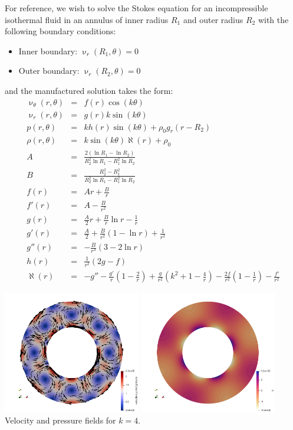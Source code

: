 For reference, we wish to solve the Stokes equation for an incompressible
isothermal fluid in an annulus of inner radius $R_1$
and outer radius $R_2$ with the following boundary conditions:
\begin{itemize}
\item Inner boundary: $\upnu_r(R_1,\theta)=0$ 
\item Outer boundary: $\upnu_r(R_2,\theta)=0$ 
\end{itemize}
and the manufactured solution takes the form:
\begin{eqnarray}
\upnu_\theta(r,\theta) &=& f(r) \cos(k\theta) \\
\upnu_r(r,\theta) &=& g(r) k  \sin(k\theta)  \\
p(r,\theta) &=& k h(r) \sin(k \theta) + \rho_0 g_r (r-R_2)  \\
\rho(r,\theta) &=& k \sin (k \theta) \aleph(r) + \rho_0 \\
A &=& \frac{2(\ln R_1 - \ln R_2)} { R_2^2 \ln R_1  - R_1^2 \ln R_2}    \\
B &=& \frac{R_2^2-R_1^2}{R_2^2 \ln R_1 - R_1^2 \ln R_2} \\
f(r)   &=& Ar +\frac{B}{r} \\
f'(r)  &=& A - \frac{B}{r^2} \\
g(r)   &=& \frac{A}{2}r  +  \frac{B}{r} \ln r - \frac{1}{r} \\
g'(r)  &=& \frac{A}{2}  +  \frac{B}{r^2} (1-\ln r)   + \frac{1}{r^2} \\
g''(r) &=&  - \frac{B}{r^3} (3 - 2 \ln r )  \\
h(r)   &=& \frac{1}{r^2}(2g-f) \\
\aleph(r) &=&  -g'' - \frac{g'}{r} ( 1 - \frac{2}{r}) + \frac{g}{r^2} (k^2 + 1 -\frac{4}{r})  - \frac{2f}{r^2}  (1-\frac{1}{r}) - \frac{f'}{r^2}   
\end{eqnarray}


\begin{center}
\includegraphics[width=6cm]{python_codes/fieldstone_152/images/vel}
\includegraphics[width=6cm]{python_codes/fieldstone_152/images/press}\\
{\captionfont Velocity and pressure fields for $k=4$.}
\end{center}

